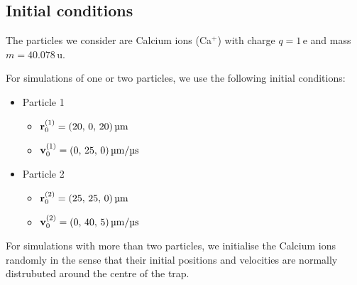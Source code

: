 \subsection{Initial conditions}\label{sec:initial_conditions}

The particles we consider are Calcium ions (Ca$^+$) with charge $q=1 \,\mathrm{e}$ and mass $m = 40.078 \,\mathrm{u}$. 

For simulations of one or two particles, we use the following initial conditions:
\begin{itemize}
    \item Particle 1\label{item:initial_conditions_p1}
    \begin{itemize}
        \item[] $\vec{r}^{(1)}_0 = (20, \,0, \,20) \, \mathrm{\text{\textmu}m} $
        \item[] $\vec{v}^{(1)}_0 = (0,\,25,\,0) \, \mathrm{\text{\textmu}m}/ \mathrm{\text{\textmu}s}$
    \end{itemize}
    \item Particle 2\label{item:initial_conditions_p2}
    \begin{itemize}
        \item[] $\vec{r}^{(2)}_0 = (25, \,25, \,0) \, \mathrm{\text{\textmu}m} $
        \item[] $\vec{v}^{(2)}_0 = (0,\,40,\,5) \, \mathrm{\text{\textmu}m}/ \mathrm{\text{\textmu}s}$
    \end{itemize}
\end{itemize}

For simulations with more than two particles, we initialise the Calcium ions randomly in the sense that their initial positions and velocities are normally distrubuted around the centre of the trap.





































